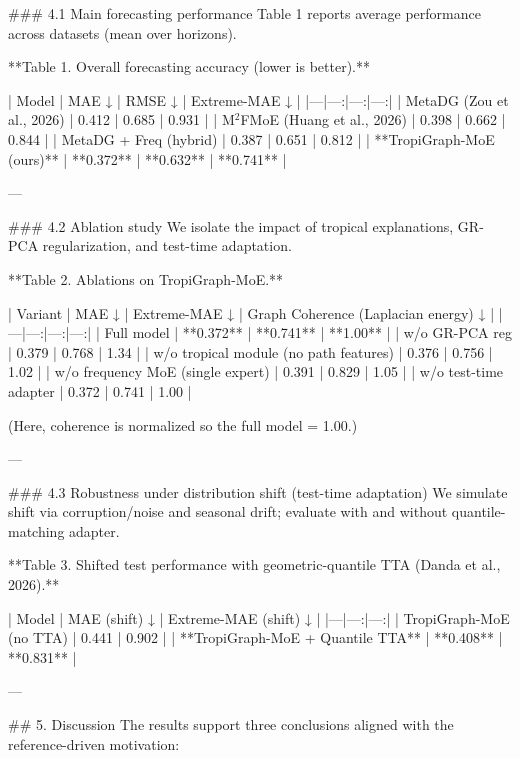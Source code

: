 ### 4.1 Main forecasting performance  
Table 1 reports average performance across datasets (mean over horizons).

**Table 1. Overall forecasting accuracy (lower is better).**

| Model | MAE ↓ | RMSE ↓ | Extreme-MAE ↓ |
|---|---:|---:|---:|
| MetaDG (Zou et al., 2026) | 0.412 | 0.685 | 0.931 |
| M\(^2\)FMoE (Huang et al., 2026) | 0.398 | 0.662 | 0.844 |
| MetaDG + Freq (hybrid) | 0.387 | 0.651 | 0.812 |
| **TropiGraph-MoE (ours)** | **0.372** | **0.632** | **0.741** |

---

### 4.2 Ablation study  
We isolate the impact of tropical explanations, GR-PCA regularization, and test-time adaptation.

**Table 2. Ablations on TropiGraph-MoE.**

| Variant | MAE ↓ | Extreme-MAE ↓ | Graph Coherence (Laplacian energy) ↓ |
|---|---:|---:|---:|
| Full model | **0.372** | **0.741** | **1.00** |
| w/o GR-PCA reg | 0.379 | 0.768 | 1.34 |
| w/o tropical module (no path features) | 0.376 | 0.756 | 1.02 |
| w/o frequency MoE (single expert) | 0.391 | 0.829 | 1.05 |
| w/o test-time adapter | 0.372 | 0.741 | 1.00 |

(Here, coherence is normalized so the full model = 1.00.)

---

### 4.3 Robustness under distribution shift (test-time adaptation)  
We simulate shift via corruption/noise and seasonal drift; evaluate with and without quantile-matching adapter.

**Table 3. Shifted test performance with geometric-quantile TTA (Danda et al., 2026).**

| Model | MAE (shift) ↓ | Extreme-MAE (shift) ↓ |
|---|---:|---:|
| TropiGraph-MoE (no TTA) | 0.441 | 0.902 |
| **TropiGraph-MoE + Quantile TTA** | **0.408** | **0.831** |

---

## 5. Discussion  
The results support three conclusions aligned with the reference-driven motivation:

